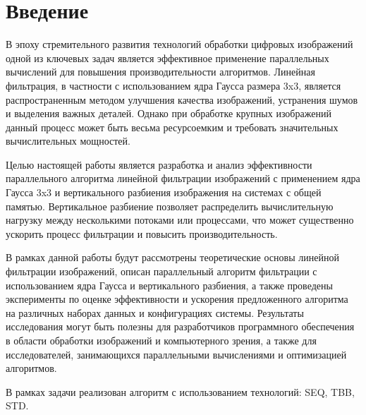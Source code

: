 \documentclass{report}
\begin{document}
\setcounter{page}{2}

\tableofcontents
\newpage

\section*{Введение}
\par В эпоху стремительного развития технологий обработки цифровых изображений одной из ключевых задач является эффективное применение параллельных вычислений для повышения производительности алгоритмов. Линейная фильтрация, в частности с использованием ядра Гаусса размера 3x3, является распространенным методом улучшения качества изображений, устранения шумов и выделения важных деталей. Однако при обработке крупных изображений данный процесс может быть весьма ресурсоемким и требовать значительных вычислительных мощностей.

\par Целью настоящей работы является разработка и анализ эффективности параллельного алгоритма линейной фильтрации изображений с применением ядра Гаусса 3x3 и вертикального разбиения изображения на системах с общей памятью. Вертикальное разбиение позволяет распределить вычислительную нагрузку между несколькими потоками или процессами, что может существенно ускорить процесс фильтрации и повысить производительность.

\par В рамках данной работы будут рассмотрены теоретические основы линейной фильтрации изображений, описан параллельный алгоритм фильтрации с использованием ядра Гаусса и вертикального разбиения, а также проведены эксперименты по оценке эффективности и ускорения предложенного алгоритма на различных наборах данных и конфигурациях системы. Результаты исследования могут быть полезны для разработчиков программного обеспечения в области обработки изображений и компьютерного зрения, а также для исследователей, занимающихся параллельными вычислениями и оптимизацией алгоритмов.

\par В рамках задачи реализован алгоритм с использованием технологий: SEQ, TBB, STD.

\newpage

\end{document}
